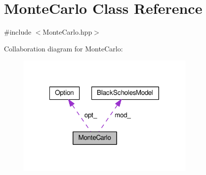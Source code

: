 \hypertarget{classMonteCarlo}{\section{Monte\-Carlo Class Reference}
\label{classMonteCarlo}
}


{\ttfamily \#include $<$Monte\-Carlo.\-hpp$>$}



Collaboration diagram for Monte\-Carlo\-:
\nopagebreak
\begin{figure}[H]
\begin{center}
\leavevmode
\includegraphics[width=245pt]{classMonteCarlo__coll__graph}
\end{center}
\end{figure}

